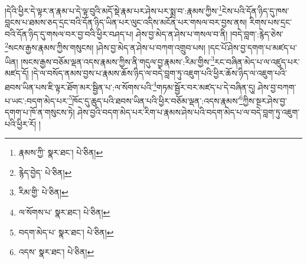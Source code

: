 །དེའི་ཕྱིར་དེ་ལྟར་ན་རྣམ་པ་དེ་ལྟ་བུའི་མདོ་སྡེ་རྣམ་པར་ཤེས་པར་སྨྲ་བ་:རྣམས་ཀྱིས་\footnote{རྣམས་ཀྱི་  སྣར་ཐང་།  པེ་ཅིན། }ངེས་པའི་དོན་ཉིད་དུ་ཁས་བླངས་པ་ཐམས་ཅད་དྲང་བའི་དོན་ཉིད་ཡིན་པར་ལུང་འདིས་མངོན་པར་གསལ་བར་བྱས་ནས། རིགས་པས་དྲང་བའི་དོན་ཉིད་དུ་གསལ་བར་བྱ་བའི་ཕྱིར་བཤད་པ། ཤེས་བྱ་མེད་ན་ཤེས་པ་གསལ་བ་ནི། །བདེ་བླག་:རྙེད་ཅེས་\footnote{རྙེད་བྱེད་  པེ་ཅིན། }སངས་རྒྱས་རྣམས་ཀྱིས་གསུངས། །ཤེས་བྱ་མེད་ན་ཤེས་པ་བཀག་འགྲུབ་པས། །དང་པོ་ཤེས་བྱ་དགག་པ་མཛད་པ་ཡིན། །སངས་རྒྱས་བཅོམ་ལྡན་འདས་རྣམས་ཀྱིས་ནི་གདུལ་བྱ་རྣམས་:རིམ་གྱིས་\footnote{རིམ་གྱི་  པེ་ཅིན། }རང་བཞིན་མེད་པ་ལ་འཛུད་པར་མཛད་དོ། །དེ་ལ་བསོད་ནམས་བྱས་པ་རྣམས་ཆོས་ཉིད་ལ་བདེ་བླག་ཏུ་འཇུག་པའི་ཕྱིར་ཆོས་ཉིད་ལ་འཇུག་པའི་ཐབས་ཡིན་པས་ཇི་ལྟར་ཐོག་མར་སྦྱིན་པ་:ལ་སོགས་པའི་\footnote{ལ་སོགས་པ་  སྣར་ཐང་།  པེ་ཅིན། }གཏམ་སྦྱོར་བར་མཛད་པ་དེ་བཞིན་དུ། ཤེས་བྱ་བཀག་པ་ཡང་:བདག་མེད་པར་\footnote{བདག་མེད་པ་  སྣར་ཐང་།  པེ་ཅིན། }ཁོང་དུ་ཆུད་པའི་ཐབས་ཡིན་པའི་ཕྱིར་བཅོམ་ལྡན་:འདས་རྣམས་\footnote{འདས་  སྣར་ཐང་།  པེ་ཅིན། }ཀྱིས་སྔར་ཤེས་བྱ་དགག་པ་ཁོ་ན་གསུངས་ཏེ། ཤེས་བྱའི་བདག་མེད་པར་རིག་པ་རྣམས་ཤེས་པའི་བདག་མེད་པ་ལ་བདེ་བླག་ཏུ་འཇུག་པའི་ཕྱིར་རོ། །
